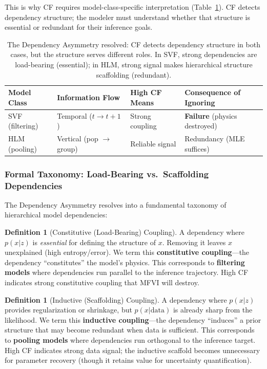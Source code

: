 \documentclass[10pt]{article} %
\theoremstyle{plain}
\theoremstyle{definition}
\newtheorem{definition}[theorem]{Definition}
\begin{document}
\noindent This is why CF requires model-class-specific interpretation (Table~\ref{tab:asymmetry}). CF detects dependency structure; the modeler must understand whether that structure is essential or redundant for their inference goals.

\begin{table}[!htbp]
\centering
\begin{tabular}{llll}
\toprule
Model Class & Information Flow & High CF Means & Consequence of Ignoring \\
\midrule
SVF (filtering) & Temporal ($t \to t+1$) & Strong coupling & \textbf{Failure} (physics destroyed) \\
HLM (pooling) & Vertical (pop $\to$ group) & Reliable signal & Redundancy (MLE suffices) \\
\bottomrule
\end{tabular}
\caption{The Dependency Asymmetry resolved: CF detects dependency structure in both cases, but the structure serves different roles. In SVF, strong dependencies are load-bearing (essential); in HLM, strong signal makes hierarchical structure scaffolding (redundant).}
\label{tab:asymmetry}
\end{table}

\subsubsection{Formal Taxonomy: Load-Bearing vs.\ Scaffolding Dependencies}

The Dependency Asymmetry resolves into a fundamental taxonomy of hierarchical model dependencies:

\begin{definition}[Constitutive (Load-Bearing) Coupling]
A dependency where $p(x|z)$ is \emph{essential} for defining the structure of $x$. Removing it leaves $x$ unexplained (high entropy/error). We term this \textbf{constitutive coupling}---the dependency ``constitutes'' the model's physics. This corresponds to \textbf{filtering models} where dependencies run parallel to the inference trajectory. High CF indicates strong constitutive coupling that MFVI will destroy.
\end{definition}

\begin{definition}[Inductive (Scaffolding) Coupling]
A dependency where $p(x|z)$ provides regularization or shrinkage, but $p(x|\text{data})$ is already sharp from the likelihood. We term this \textbf{inductive coupling}---the dependency ``induces'' a prior structure that may become redundant when data is sufficient. This corresponds to \textbf{pooling models} where dependencies run orthogonal to the inference target. High CF indicates strong data signal; the inductive scaffold becomes unnecessary for parameter recovery (though it retains value for uncertainty quantification).
\end{definition}
\end{document}
